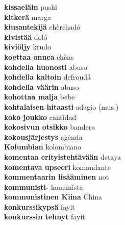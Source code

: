 \textbf{ kissaeläin  } pushi \\
\textbf{ kitkerä  } marga \\
\textbf{ kiusantekijä  } chèrchadó \\
\textbf{ kivistää  } doló \\
\textbf{ kiviöljy  } krudo \\
\textbf{ koettaa onnea  } chèns \\
\textbf{ kohdella huonosti  } abuso \\
\textbf{ kohdella kaltoin  } defroudá \\
\textbf{ kohdella väärin  } abuso \\
\textbf{ kohottaa malja  } bebe \\
\textbf{ kohtalaisen hitaasti  } adagio (mus.) \\
\textbf{ koko joukko  } cantidad \\
\textbf{ kokosivun otsikko  } bandera \\
\textbf{ kokousjärjestys  } agènda \\
\textbf{ Kolumbian  } kolombiano \\
\textbf{ komentaa erityistehtävään  } detaya \\
\textbf{ komentava upseeri  } komandante \\
\textbf{ kommentaarin lisääminen  } not \\
\textbf{ kommunisti-  } komunista \\
\textbf{ kommunistinen Kiina  } China \\
\textbf{ konkurssikypsä  } fayit \\
\textbf{ konkurssin tehnyt  } fayit \\
